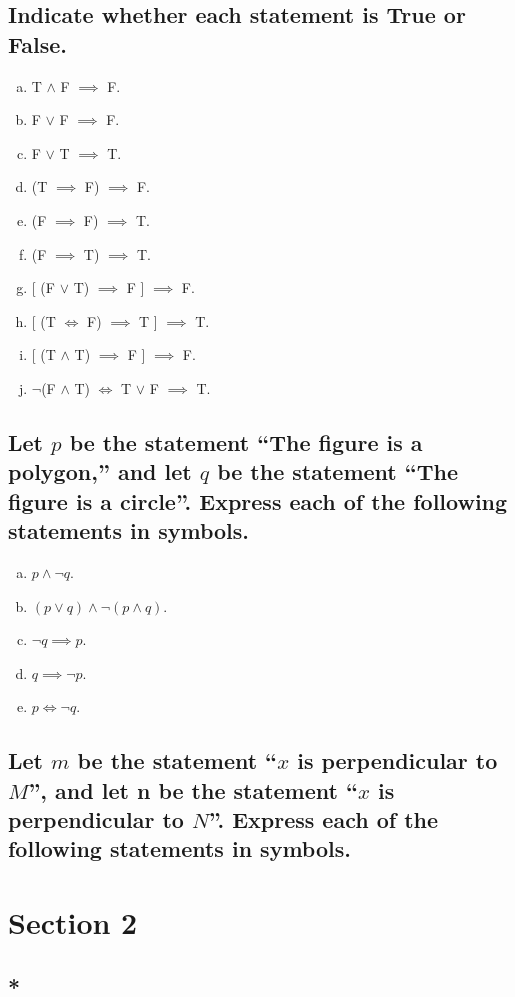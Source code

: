 \documentclass[12pt]{scrartcl} %
\begin{document}
\subsection{Indicate whether each statement is True or False.}
\begin{enumerate}[(a)]
	\item T $\land$ F $\implies$ F.
	\item F $\lor$ F $\implies$ F.
	\item F $\lor$ T $\implies$ T.
	\item (T $\implies$ F) $\implies$ F.
	\item (F $\implies$ F) $\implies$ T.
	\item (F $\implies$ T) $\implies$ T.
	\item {[} (F $\lor$ T) $\implies$ F {]} $\implies$ F.
	\item {[} (T $\iff$ F) $\implies$ T {]} $\implies$ T.
	\item {[} (T $\land$ T) $\implies$ F {]} $\implies$ F.
	\item $\neg$(F $\land$ T) $\iff$ T $\lor$ F $\implies$ T.
\end{enumerate}

\subsection{Let $p$ be the statement ``The figure is a polygon,'' and let $q$ be the statement ``The figure is a circle''. Express each of the following statements in
symbols.}
\begin{enumerate}[(a)]
	\item $p \land \neg q$.
	\item $(p \lor q) \land \neg (p \land q)$.
	\item $\neg q \implies p$.
	\item $q \implies \neg p$.
	\item $p \iff \neg q$.

\end{enumerate}
\subsection{Let $m$ be the statement ``$x$ is perpendicular to $M$'', and let n be the statement
``$x$ is perpendicular to $N$''. Express each of the following statements in
symbols.}

\section{Section 2}

\subsection{*}
\end{document}
